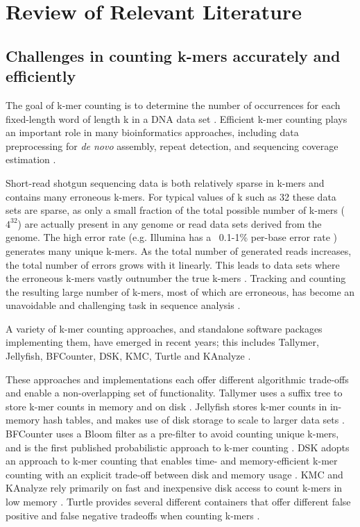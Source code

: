 \chapter{Review of Relevant Literature}


\section{Challenges in counting k-mers accurately and efficiently}

The goal of k-mer counting is to determine the number of occurrences for each
fixed-length word of length k in a DNA data set \cite{Marcais2011}. Efficient
k-mer counting plays an important role in many bioinformatics approaches,
including data preprocessing for \textit{de novo} assembly, repeat detection, and
sequencing coverage estimation \cite{Kurtz2008}.

Short-read shotgun sequencing data is both relatively sparse in k-mers and
contains many erroneous k-mers.  For typical values of k such as 32 these data
sets are sparse, as only a small fraction of the total possible number of
k-mers ($4^{32}$) are actually present in any genome or read data sets derived
from the genome.  The high error rate (e.g. Illumina has a ~0.1-1\% per-base
error rate \cite{pubmed19997069}) generates many unique k-mers.  As the total
number of generated reads increases, the total number of errors grows with it
linearly. This leads to data sets where the erroneous k-mers vastly outnumber
the true k-mers \cite{Conway2011}.  Tracking and counting the resulting large
number of k-mers, most of which are erroneous, has become an unavoidable and
challenging task in sequence analysis \cite{Minoche2011}.

A variety of k-mer counting approaches, and standalone software packages
implementing them, have emerged in recent years; this includes Tallymer,
Jellyfish, BFCounter, DSK, KMC, Turtle and KAnalyze \cite{Kurtz2008,
Marcais2011, Melsted2011, Rizk2013, Deorowicz2013, Roy2014, Audano2014}.

These approaches and implementations each offer different algorithmic
trade-offs and enable a non-overlapping set of functionality. Tallymer uses a
suffix tree to store k-mer counts in memory and on disk \cite{Kurtz2008}. 
Jellyfish stores k-mer counts in in-memory hash tables, and makes use of disk
storage to scale to larger data sets \cite{Marcais2011}.  BFCounter uses a
Bloom filter as a pre-filter to avoid counting unique k-mers, and is the first
published probabilistic approach to k-mer counting \cite{Melsted2011}.  DSK
adopts an approach to k-mer counting that enables time- and memory-efficient
k-mer counting with an explicit trade-off between disk and memory usage
\cite{Rizk2013}.  KMC and KAnalyze rely primarily on fast and inexpensive disk
access to count k-mers in low memory \cite{Deorowicz2013,Audano2014}.  Turtle
provides several different containers that offer different false positive and
false negative tradeoffs when counting k-mers \cite{Roy2014}.


